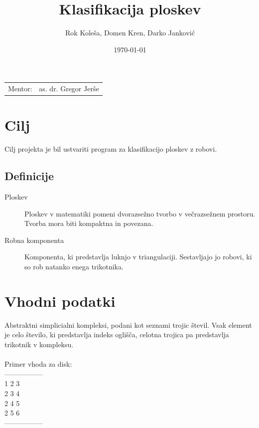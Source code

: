 \documentclass{article}
\title{Klasifikacija ploskev} %
\author{Rok Koleša, Domen Kren, Darko Janković} %
\date{\today} %
\begin{document}
\maketitle %

\begin{center}
\begin{tabular}{l r}
Mentor: & as. dr. Gregor Jerše %
\end{tabular}
\end{center}


\newpage
\tableofcontents
\newpage

\section{Cilj}
Cilj projekta je bil ustvariti program za klasifikacijo ploskev z robovi.

\subsection{Definicije}
\label{definicije}
\begin{description}
\item[Ploskev]
Ploskev v matematiki pomeni dvorazsežno tvorbo v večrazsežnem prostoru. Tvorba mora biti kompaktna in povezana.
\item[Robna komponenta]
Komponenta, ki predstavlja luknjo v triangulaciji. Sestavljajo jo robovi, ki so rob natanko enega trikotnika.
\end{description} 
 

\section{Vhodni podatki}
Abstraktni simplicialni kompleksi, podani kot seznami trojic števil. Vsak element je celo število, ki predstavlja indeks oglišča, celotna trojica pa predstavlja trikotnik v kompleksu.
\\\\
Primer vhoda za disk:  \\
-----------------  \\
1 2 3 \\
2 3 4 \\
2 4 5 \\
2 5 6 \\
-----------------  \\
\end{document}
